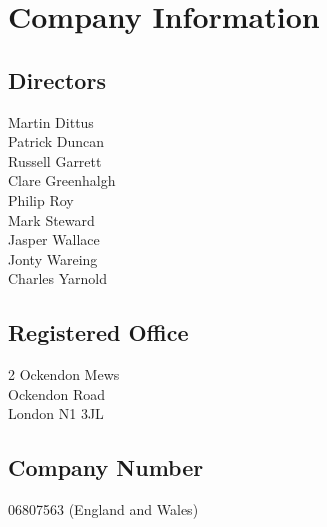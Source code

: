 \tableofcontents
\vfill
\section{Company Information}

\subsection{Directors}
Martin Dittus \\
Patrick Duncan \\
Russell Garrett \\
Clare Greenhalgh \\
Philip Roy \\
Mark Steward \\
Jasper Wallace \\
Jonty Wareing \\
Charles Yarnold

\subsection{Registered Office}

2 Ockendon Mews \\
Ockendon Road \\
London N1 3JL

\subsection{Company Number}
06807563 (England and Wales)
